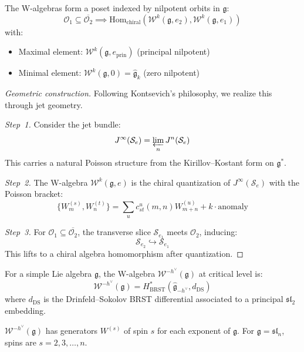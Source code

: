 \begin{theorem}\label{thm:w-poset}
The W-algebras form a poset indexed by nilpotent orbits in $\mathfrak{g}$:
\[
\mathcal{O}_1 \subseteq \overline{\mathcal{O}_2} \implies 
\text{Hom}_{\text{chiral}}(\mathcal{W}^k(\mathfrak{g}, e_2), \mathcal{W}^k(\mathfrak{g}, e_1))
\]
with:
\begin{itemize}
\item Maximal element: $\mathcal{W}^k(\mathfrak{g}, e_{\text{prin}})$ (principal nilpotent)
\item Minimal element: $\mathcal{W}^k(\mathfrak{g}, 0) = \widehat{\mathfrak{g}}_k$ (zero nilpotent)
\end{itemize}
\end{theorem}
 
\begin{proof}[Geometric construction]
Following Kontsevich's philosophy, we realize this through jet geometry.
 
\emph{Step~1.} Consider the jet bundle:
\[
J^{\infty}(\mathcal{S}_e) = \varprojlim_{n} J^n(\mathcal{S}_e)
\]
This carries a natural Poisson structure from the Kirillov--Kostant form on $\mathfrak{g}^*$.
 
\emph{Step~2.} The W-algebra $\mathcal{W}^k(\mathfrak{g}, e)$ is the chiral 
quantization of $J^{\infty}(\mathcal{S}_e)$ with the Poisson bracket:
\[
\{W^{(s)}_m, W^{(t)}_n\} = \sum_{u} c_{st}^u(m,n) W^{(u)}_{m+n} + k \cdot \text{anomaly}
\]
 
\emph{Step~3.} For $\mathcal{O}_1 \subseteq \overline{\mathcal{O}_2}$, the 
transverse slice $\mathcal{S}_{e_1}$ meets $\mathcal{O}_2$, inducing:
\[
\mathcal{S}_{e_2} \hookrightarrow \mathcal{S}_{e_1}
\]
This lifts to a chiral algebra homomorphism after quantization.
\end{proof}
 
\begin{definition}
For a simple Lie algebra $\mathfrak{g}$, the W-algebra $\mathcal{W}^{-h^\vee}(\mathfrak{g})$ at critical 
level is:
\[
\mathcal{W}^{-h^\vee}(\mathfrak{g}) = H^*_{\text{BRST}}(\widehat{\mathfrak{g}}_{-h^\vee}, d_{\text{DS}})
\]
where $d_{\text{DS}}$ is the Drinfeld--Sokolov BRST differential associated to a principal $\mathfrak{sl}_2$ 
embedding.
\end{definition}
 
\begin{remark}[Generators]
$\mathcal{W}^{-h^\vee}(\mathfrak{g})$ has generators $W^{(s)}$ of spin $s$ for each exponent of $\mathfrak{g}$. 
For $\mathfrak{g} = \mathfrak{sl}_n$, spins are $s = 2, 3, \ldots, n$.
\end{remark}
 
